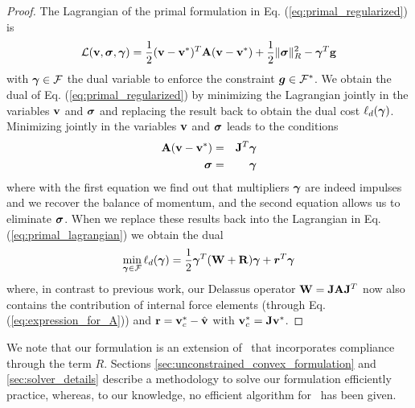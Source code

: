 \begin{proof}
The Lagrangian of the primal formulation in Eq. (\ref{eq:primal_regularized}) is
\begin{equation}
	\mathcal{L}(\mf{v},\bsigma,\vf{\gamma}) = \frac{1}{2}(\mf{v}-\mf{v}^*)^T\mf{A}(\mf{v}-\mf{v}^*) + \frac{1}{2} \Vert\bsigma\Vert_{R}^2 - \vf{\gamma}^T\mf{g}
	\label{eq:primal_lagrangian}
\end{equation}
with ${\bm{\gamma}}\in\mathcal{F}$ the dual variable to enforce the constraint
${\bm{g}}\in \mathcal{F}^*$. We obtain the dual of Eq.
(\ref{eq:primal_regularized}) by minimizing the Lagrangian jointly in the
variables ${\mathbf{v}}$ and ${\bm\sigma}$ and replacing the result back to obtain the
dual cost $\ell_d({\bm{\gamma}})$. Minimizing jointly in the variables ${\mathbf{v}}$
and ${\bm\sigma}$ leads to the conditions
\begin{eqnarray}
	{\mathbf{A}}({\mathbf{v}}-{\mathbf{v}}^*) &=& {\mathbf{J}}^T{\bm{\gamma}}\\
	{\bm{\sigma}} &=& {\bm{\gamma}}
\end{eqnarray}
where with the first equation we find out that multipliers ${\bm\gamma}$ are indeed
impulses and we recover the balance of momentum, and the second equation allows
us to eliminate ${\bm{\sigma}}$. When we replace these results back into the
Lagrangian in Eq. (\ref{eq:primal_lagrangian}) we obtain the dual
\begin{eqnarray}
	\min_{{\bm\gamma}\in \mathcal{F}} \ell_d({\bm\gamma}) =
	\frac{1}{2}{\bm\gamma}^T(\mathbf{W}+\mathbf{R}){\bm\gamma} + {\bm r}^T
	{\bm\gamma}
\end{eqnarray}
where, in contrast to previous work, our Delassus operator
${\mathbf{W}}={\mathbf{J}}{\mathbf{A}}{\mathbf{J}}^T$ now also contains the contribution of internal
force elements (through Eq. (\ref{eq:expression_for_A})) and
${\mathbf{r}}={\mathbf{v}}_c^*-\hat{{\mathbf{v}}}$ with ${\mathbf{v}}_c^*={\mathbf{J}}{\mathbf{v}}^*$.
\end{proof}

We note that our formulation is an extension of~\cite{bib:mazhar2014} that
incorporates  compliance through the term $R$. Sections
\ref{sec:unconstrained_convex_formulation} and \ref{sec:solver_details} 
describe a methodology to solve our formulation efficiently practice, whereas,
to our knowledge, no efficient algorithm for~\cite{bib:mazhar2014} has been given. 





